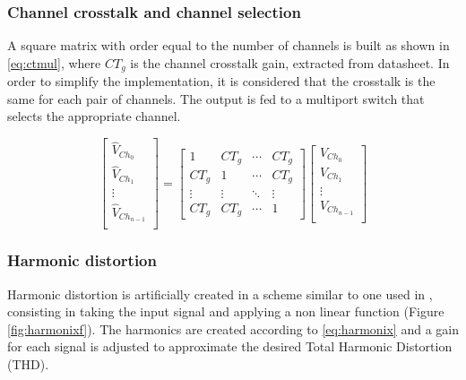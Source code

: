 \documentclass[conference]{IEEEtran}
\begin{document}
\subsubsection{Channel crosstalk and channel selection}

A square matrix with order equal to the number of channels is built as shown in \ref{eq:ctmul}, where $CT_g$ is the channel crosstalk gain, extracted from datasheet. In order to simplify the implementation, it is considered that the crosstalk is the same for each pair of channels. The output is fed to a multiport switch that selects the appropriate channel.

\begin{equation}
\begin{bmatrix}
 \hat{V}_{Ch_0} \\
 \hat{V}_{Ch_1} \\
  \vdots  \\
 \hat{V}_{Ch_{n-1}} \\
 \end{bmatrix} 
=
 \begin{bmatrix}
  1 & CT_g & \cdots & CT_g \\
  CT_g & 1 & \cdots & CT_g \\
  \vdots  & \vdots  & \ddots & \vdots  \\
  CT_g & CT_g & \cdots & 1
 \end{bmatrix}
\begin{bmatrix}
 V_{Ch_0} \\
 V_{Ch_1} \\
  \vdots  \\
 V_{Ch_{n-1}} \\
 \end{bmatrix}
\label{eq:ctmul}
\end{equation}


\subsubsection{Harmonic distortion}

Harmonic distortion is artificially created in a scheme similar to one used in \cite{taheri}, consisting in taking the input signal and applying a non linear function (Figure \ref{fig:harmonixf}). The harmonics are created according to \ref{eq:harmonix} and a gain for each signal is adjusted to approximate the desired Total Harmonic Distortion (THD).
\end{document}
